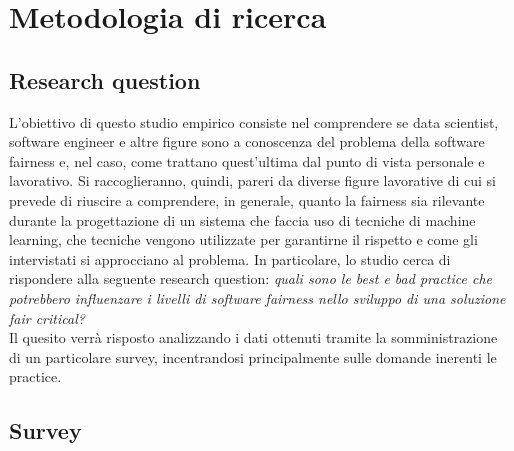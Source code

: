 \chapter{Metodologia di ricerca} %
%

\section{Research question}
L'obiettivo di questo studio empirico consiste nel comprendere se data scientist, software engineer e altre figure sono a conoscenza del problema della software fairness e, nel caso, come trattano quest'ultima dal punto di vista personale e lavorativo. Si raccoglieranno, quindi, pareri da diverse figure lavorative di cui si prevede di riuscire a comprendere, in generale, quanto la fairness sia rilevante durante la progettazione di un sistema che faccia uso di tecniche di machine learning, che tecniche vengono utilizzate per garantirne il rispetto e come gli intervistati si approcciano al problema. In particolare, lo studio cerca di rispondere alla seguente research question: \emph{quali sono le best e bad practice che potrebbero influenzare i livelli di software fairness nello sviluppo di una soluzione fair critical?}\\
Il quesito verrà risposto analizzando i dati ottenuti tramite la somministrazione di un particolare survey, incentrandosi principalmente sulle domande inerenti le practice.

\section{Survey}
